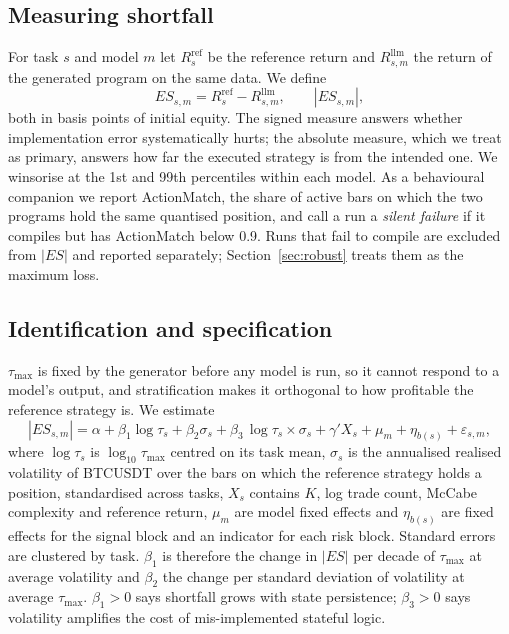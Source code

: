 \documentclass[a4paper,fleqn]{cas-sc}
\begin{document}
\subsection{Measuring shortfall}

For task $s$ and model $m$ let $R^{\mathrm{ref}}_s$ be the reference return and $R^{\mathrm{llm}}_{s,m}$ the return of the generated program on the same data. We define
\begin{equation}
ES_{s,m} = R^{\mathrm{ref}}_s - R^{\mathrm{llm}}_{s,m}, \qquad |ES_{s,m}|,
\end{equation}
both in basis points of initial equity. The signed measure answers whether implementation error systematically hurts; the absolute measure, which we treat as primary, answers how far the executed strategy is from the intended one. We winsorise at the 1st and 99th percentiles within each model. As a behavioural companion we report ActionMatch, the share of active bars on which the two programs hold the same quantised position, and call a run a \emph{silent failure} if it compiles but has ActionMatch below 0.9. Runs that fail to compile are excluded from $|ES|$ and reported separately; Section~\ref{sec:robust} treats them as the maximum loss.

\subsection{Identification and specification}

$\tau_{\max}$ is fixed by the generator before any model is run, so it cannot respond to a model's output, and stratification makes it orthogonal to how profitable the reference strategy is. We estimate
\begin{equation}
|ES_{s,m}| = \alpha + \beta_1 \log\tau_{s} + \beta_2 \sigma_{s} + \beta_3 \,\log\tau_{s}\times\sigma_{s} + \gamma' X_{s} + \mu_m + \eta_{b(s)} + \varepsilon_{s,m},
\label{eq:main}
\end{equation}
where $\log\tau_s$ is $\log_{10}\tau_{\max}$ centred on its task mean, $\sigma_s$ is the annualised realised volatility of BTCUSDT over the bars on which the reference strategy holds a position, standardised across tasks, $X_s$ contains $K$, log trade count, McCabe complexity and reference return, $\mu_m$ are model fixed effects and $\eta_{b(s)}$ are fixed effects for the signal block and an indicator for each risk block. Standard errors are clustered by task. $\beta_1$ is therefore the change in $|ES|$ per decade of $\tau_{\max}$ at average volatility and $\beta_2$ the change per standard deviation of volatility at average $\tau_{\max}$. $\beta_1>0$ says shortfall grows with state persistence; $\beta_3>0$ says volatility amplifies the cost of mis-implemented stateful logic.
\end{document}
